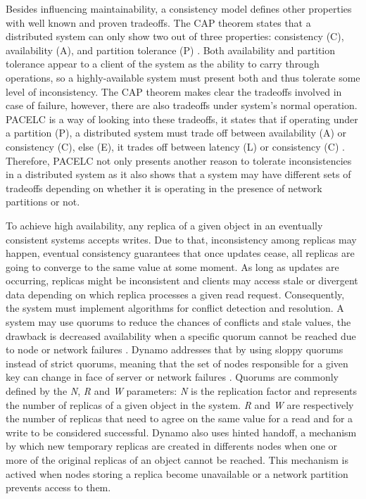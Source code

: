 \documentclass[doublespacing]{bmcart}
\begin{document}
Besides influencing maintainability, a consistency model defines other
properties with well known and proven tradeoffs. The CAP theorem states that a
distributed system can only show two out of three properties: consistency (C),
availability (A), and partition tolerance (P) \cite{Brewer2000,Gilbert2002}.
Both availability and partition tolerance appear to a client of the system as
the ability to carry through operations, so a highly-available system must
present both and thus tolerate some level of inconsistency. The CAP theorem
makes clear the tradeoffs involved in case of failure, however, there are also
tradeoffs under system's normal operation. PACELC is a way of looking into
these tradeoffs, it states that if operating under a partition (P), a
distributed system must trade off between availability (A) or consistency (C),
else (E), it trades off between latency (L) or consistency (C)
\cite{Abadi2012}. Therefore, PACELC not only presents another reason to
tolerate inconsistencies in a distributed system as it also shows that a system
may have different sets of tradeoffs depending on whether it is operating in
the presence of network partitions or not.

To achieve high availability, any replica of a given object in an eventually
consistent systems accepts writes. Due to that, inconsistency among replicas
may happen, eventual consistency guarantees that once updates cease, all
replicas are going to converge to the same value at some moment. As long as
updates are occurring, replicas might be inconsistent and clients may access
stale or divergent data depending on which replica processes a given read
request. Consequently, the system must implement algorithms for conflict
detection and resolution. A system may use quorums to reduce the chances of
conflicts and stale values, the drawback is decreased availability when a
specific quorum cannot be reached due to node or network failures
\cite{Vogels2009}. Dynamo addresses that by using sloppy quorums instead of
strict quorums, meaning that the set of nodes responsible for a given key can
change in face of server or network failures \cite{DeCandia2007}. Quorums are
commonly defined by the \textit{N}, \textit{R} and \textit{W} parameters:
\textit{N} is the replication factor and represents the number of replicas of a
given object in the system. \textit{R} and \textit{W} are respectively the
number of replicas that need to agree on the same value for a read and for a
write to be considered successful. Dynamo also uses hinted handoff, a mechanism
by which new temporary replicas are created in differents nodes when one or
more of the original replicas of an object cannot be reached. This mechanism is
actived when nodes storing a replica become unavailable or a network partition
prevents access to them.
\end{document}

